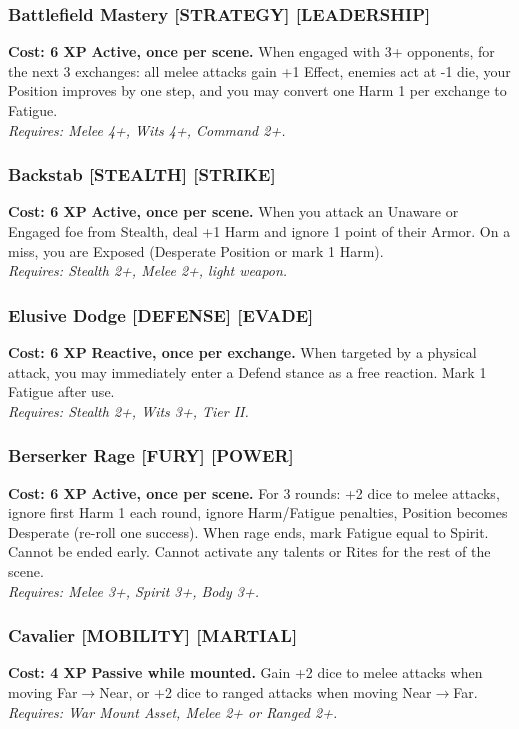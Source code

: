 \documentclass[12pt,a4paper]{book}
\begin{document}
\subsubsection*{Battlefield Mastery \textnormal{[STRATEGY] [LEADERSHIP]}}
\label{talent:battlefield-mastery}
\textbf{Cost: 6 XP} \textbf{Active, once per scene.} When engaged with 3+ opponents, for the next 3 exchanges: all melee attacks gain +1 Effect, enemies act at -1 die, your Position improves by one step, and you may convert one Harm 1 per exchange to Fatigue. \\
\textit{Requires: Melee 4+, Wits 4+, Command 2+.}

\subsubsection*{Backstab \textnormal{[STEALTH] [STRIKE]}}
\label{talent:backstab}
\textbf{Cost: 6 XP} \textbf{Active, once per scene.} When you attack an Unaware or Engaged foe from Stealth, deal +1 Harm and ignore 1 point of their Armor. On a miss, you are Exposed (Desperate Position or mark 1 Harm). \\
\textit{Requires: Stealth 2+, Melee 2+, light weapon.}

\subsubsection*{Elusive Dodge \textnormal{[DEFENSE] [EVADE]}}
\label{talent:elusive-dodge}
\textbf{Cost: 6 XP} \textbf{Reactive, once per exchange.} When targeted by a physical attack, you may immediately enter a Defend stance as a free reaction. Mark 1 Fatigue after use. \\
\textit{Requires: Stealth 2+, Wits 3+, Tier II.}

\subsubsection*{Berserker Rage \textnormal{[FURY] [POWER]}}
\label{talent:berserker-rage}
\textbf{Cost: 6 XP} \textbf{Active, once per scene.} For 3 rounds: +2 dice to melee attacks, ignore first Harm 1 each round, ignore Harm/Fatigue penalties, Position becomes Desperate (re-roll one success). When rage ends, mark Fatigue equal to Spirit. Cannot be ended early. Cannot activate any talents or Rites for the rest of the scene. \\
\textit{Requires: Melee 3+, Spirit 3+, Body 3+.}

\subsubsection*{Cavalier \textnormal{[MOBILITY] [MARTIAL]}}
\label{talent:cavalier}
\textbf{Cost: 4 XP} \textbf{Passive while mounted.} Gain +2 dice to melee attacks when moving Far$\rightarrow$Near, or +2 dice to ranged attacks when moving Near$\rightarrow$Far. \\
\textit{Requires: War Mount Asset, Melee 2+ or Ranged 2+.}
\end{document}
